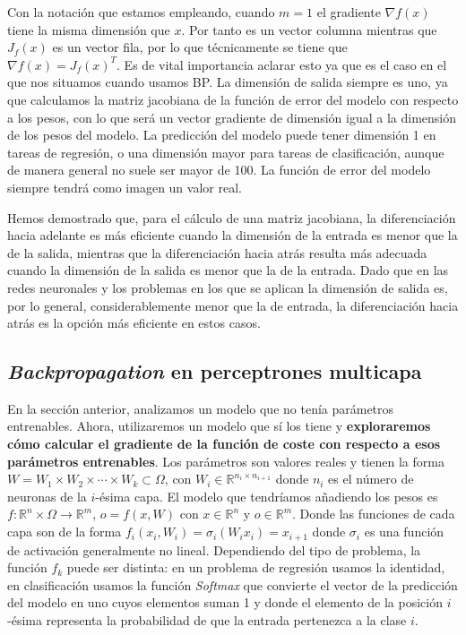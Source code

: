 Con la notación que estamos empleando, cuando $m=1$ el gradiente $\nabla f(x)$ tiene la misma dimensión que $x$. Por tanto es un vector columna mientras que $J_f(x)$ es un vector fila, por lo que técnicamente se tiene que $\nabla f(x)= J_f(x)^T$. Es de vital importancia aclarar esto ya que es el caso en el que nos situamos cuando usamos BP. La dimensión de salida siempre es uno, ya que calculamos la matriz jacobiana de la función de error del modelo con respecto a los pesos, con lo que será un vector gradiente de dimensión igual a la dimensión de los pesos del modelo. La predicción del modelo puede tener dimensión 1 en tareas de regresión, o una dimensión mayor para tareas de clasificación, aunque de manera general no suele ser mayor de 100. La función de error del modelo siempre tendrá como imagen un valor real.


Hemos demostrado que, para el cálculo de una matriz jacobiana, la diferenciación hacia adelante es más eficiente cuando la dimensión de la entrada es menor que la de la salida, mientras que la diferenciación hacia atrás resulta más adecuada cuando la dimensión de la salida es menor que la de la entrada. Dado que en las redes neuronales y los problemas en los que se aplican la dimensión de salida es, por lo general, considerablemente menor que la de entrada, la diferenciación hacia atrás es la opción más eficiente en estos casos.




\subsection{\textit{Backpropagation} en perceptrones multicapa}


En la sección anterior, analizamos un modelo que no tenía parámetros entrenables. Ahora, utilizaremos un modelo que sí los tiene y \textbf{exploraremos cómo calcular el gradiente de la función de coste con respecto a esos parámetros entrenables}. Los parámetros son valores reales y tienen la forma $W= W_1 \times W_2 \times \cdots \times W_k \subset \Omega$, con $W_i \in \mathbb{R}^{n_i \times n_{i+1}}$ donde $n_i$ es el número de neuronas de la $i$-ésima capa. El modelo que tendríamos añadiendo los pesos es $f: \mathbb{R}^n \times \Omega \rightarrow \mathbb{R}^m$, $o=f(x,W)$ con $x \in \mathbb{R}^n$  y $o \in \mathbb{R}^m$. Donde las funciones de cada capa son de la forma $f_i(x_i, W_i)= \sigma_i(W_ix_i)=x_{i+1}$ donde $\sigma_i$ es una función de activación generalmente no lineal. Dependiendo del tipo de problema, la función $f_k$ puede ser distinta: en un problema de regresión usamos la identidad, en clasificación usamos la función \textit{Softmax} que convierte el vector de la predicción del modelo en uno cuyos elementos suman 1 y donde el elemento de la posición $i$-ésima representa la probabilidad de que la entrada pertenezca a la clase $i$.


